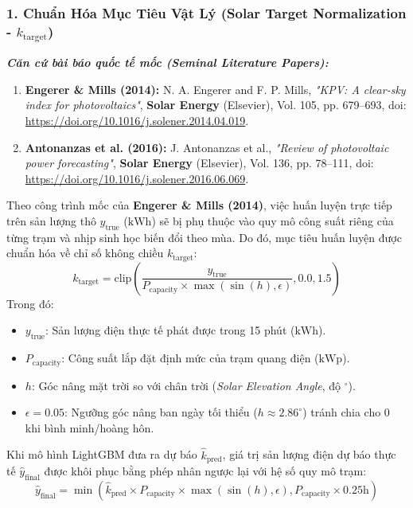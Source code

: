 \documentclass[12pt,a4paper]{article}
\begin{document}
\subsubsection{1. Chuẩn Hóa Mục Tiêu Vật Lý (Solar Target Normalization - \texorpdfstring{$k_{\text{target}}$}{k_target})}
\textit{\textbf{Căn cứ bài báo quốc tế mốc (Seminal Literature Papers):}}
\begin{enumerate}
    \item \textbf{Engerer \& Mills (2014):} N. A. Engerer and F. P. Mills, \textit{"KPV: A clear-sky index for photovoltaics"}, \textbf{Solar Energy} (Elsevier), Vol. 105, pp. 679--693, doi: \url{https://doi.org/10.1016/j.solener.2014.04.019}.
    \item \textbf{Antonanzas et al. (2016):} J. Antonanzas et al., \textit{"Review of photovoltaic power forecasting"}, \textbf{Solar Energy} (Elsevier), Vol. 136, pp. 78--111, doi: \url{https://doi.org/10.1016/j.solener.2016.06.069}.
\end{enumerate}

Theo công trình mốc của \textbf{Engerer \& Mills (2014)}, việc huấn luyện trực tiếp trên sản lượng thô $y_{\text{true}}$ ($\text{kWh}$) sẽ bị phụ thuộc vào quy mô công suất riêng của từng trạm và nhịp sinh học biến đổi theo mùa. Do đó, mục tiêu huấn luyện được chuẩn hóa về chỉ số không chiều $k_{\text{target}}$:
\begin{equation}
    k_{\text{target}} = \text{clip}\left(\frac{y_{\text{true}}}{P_{\text{capacity}} \times \max(\sin(h), \epsilon)}, 0.0, 1.5\right)
\end{equation}
Trong đó:
\begin{itemize}
    \item $y_{\text{true}}$: Sản lượng điện thực tế phát được trong 15 phút ($\text{kWh}$).
    \item $P_{\text{capacity}}$: Công suất lắp đặt định mức của trạm quang điện ($\text{kWp}$).
    \item $h$: Góc nâng mặt trời so với chân trời (\textit{Solar Elevation Angle}, độ $^\circ$).
    \item $\epsilon = 0.05$: Ngưỡng góc nâng ban ngày tối thiểu ($h \approx 2.86^\circ$) tránh chia cho 0 khi bình minh/hoàng hôn.
\end{itemize}

Khi mô hình LightGBM đưa ra dự báo $\hat{k}_{\text{pred}}$, giá trị sản lượng điện dự báo thực tế $\hat{y}_{\text{final}}$ được khôi phục bằng phép nhân ngược lại với hệ số quy mô trạm:
\begin{equation}
    \hat{y}_{\text{final}} = \min\left(\hat{k}_{\text{pred}} \times P_{\text{capacity}} \times \max(\sin(h), \epsilon), P_{\text{capacity}} \times 0.25\text{h}\right)
\end{equation}
\end{document}

